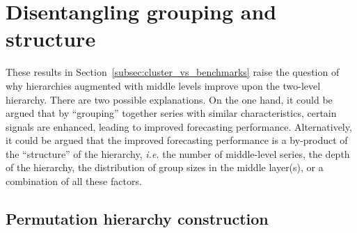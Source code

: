 \documentclass[a4paper,review,12pt,authoryear]{elsarticle}
\begin{document}

\section{Disentangling  grouping and structure}
\label{sec:permutation}

These results in Section~\ref{subsec:cluster_vs_benchmarks} raise the question of why hierarchies augmented with middle levels improve upon the two-level hierarchy. There are two possible explanations.  On the one hand, it could be argued that by ``grouping'' together series with similar characteristics, certain signals are enhanced, leading to improved forecasting performance.
Alternatively, it could be argued that the improved forecasting performance is a by-product of the ``structure'' of the hierarchy, \textit{i.e.} the number of middle-level series, the depth of the hierarchy, the distribution of group sizes in the middle layer(s), or a combination of all these factors.
\subsection{Permutation hierarchy construction}
\label{subsec:permutation}

 


\end{document}

